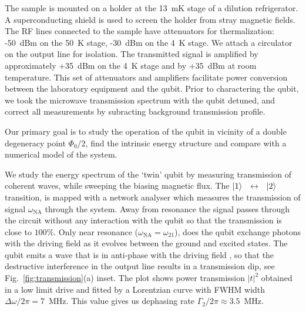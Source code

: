 \documentclass[%
reprint,
superscriptaddress,
bibnotes,
amsmath,
amssymb,
aps,
showkeys,
prb,
]{revtex4-1}
\newcommand{\iket}[1]{\ensuremath{\Ket{#1}}}
\newcommand{\ilra}{\ensuremath{\,\leftrightarrow\,}}
\begin{document}
The sample is mounted on a holder at the 13~mK
stage of  a dilution refrigerator.  A  superconducting shield is used  to screen
the holder  from stray magnetic  fields.  The RF  lines connected to  the sample
have attenuators for thermalization: -50~dBm on  the 50~K stage, -30~dBm on the
4~K  stage.  We  attach a  circulator on  the output  line for  isolation.  The
transmitted signal is amplified  by approximately +35~dBm on the 4~K stage  and by +35~dBm at
room  temperature.  This  set  of attenuators  and  amplifiers facilitate  power
conversion  between the  laboratory equipment  and the qubit.  Prior  to
charactering the qubit,  we  took  the microwave  transmission
spectrum with the qubit detuned, and  correct all measurements by subracting background
transmission profile.

Our primary goal  is to study the operation of the qubit in vicinity of a double degeneracy point $\Phi_0/2$, find the intrinsic energy structure and  compare with a numerical model of the system.

We study the energy  spectrum  of the  `twin' qubit  by measuring transmission of coherent waves,  while  sweeping  the  biasing  magnetic flux.
The  \iket{1}~\ilra~\iket{2}  transition, is  mapped  with a  network
analyser which measures  the transmission of signal  $\omega_{\text{NA}}$ through the
system.
Away from  resonance the signal passes through the  circuit without any
interaction with the qubit so that the transmission
is close to  $ 100\% $.  Only near resonance  ($\omega_{\text{NA}}=\omega_{21}$), does the
qubit exchange photons  with the driving field as it  evolves between the ground
and excited states.  The  qubit emits a wave that is in anti-phase with
the driving  field \cite{Astafiev_2010}, so that the  destructive interference in
the output line results in  a transmission dip, see Fig.~\ref{fig:transmission}(a) inset. The plot shows power transmission $|t|^2$ obtained in a low limit drive and fitted by a Lorentzian curve with FWHM width $\Delta\omega/2\pi = 7$~MHz. This value gives us dephasing rate $\Gamma_2/2\pi \approx 3.5$~MHz.
\end{document}
